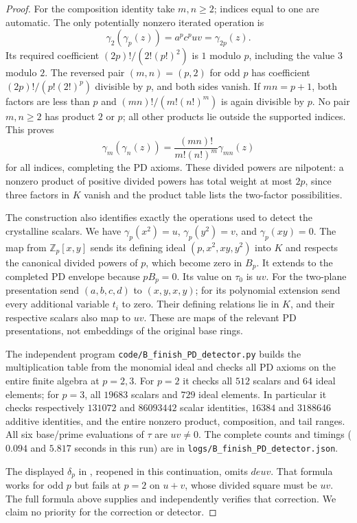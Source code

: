 \begin{proof}
For the composition identity take $m,n\geq2$; indices equal to one
are automatic. The only potentially nonzero iterated operation is
\[
 \gamma_2(\gamma_p(z))=a^pc^puv=\gamma_{2p}(z).
\]
Its required coefficient $(2p)!/(2!(p!)^2)$ is $1$ modulo $p$,
including the value $3$ modulo $2$. The reversed pair $(m,n)=(p,2)$
for odd $p$ has coefficient $(2p)!/(p!(2!)^p)$ divisible by $p$,
and both sides vanish. If $mn=p+1$, both factors are less than $p$
and $(mn)!/(m!(n!)^m)$ is again divisible by $p$. No pair $m,n\geq2$
has product $2$ or $p$; all other products lie outside the supported
indices. This proves
\[
 \gamma_m(\gamma_n(z))=
 \frac{(mn)!}{m!(n!)^m}\gamma_{mn}(z)
\]
for all indices, completing the PD axioms. These divided powers are
nilpotent: a nonzero product of positive divided powers has total
weight at most $2p$, since three factors in $K$ vanish and the
product table lists the two-factor possibilities.

The construction also identifies exactly the operations used to
detect the crystalline scalars. We have
$\gamma_p(x^2)=u$, $\gamma_p(y^2)=v$, and $\gamma_p(xy)=0$.
The map from $\mathbb Z_p[x,y]$ sends its defining ideal
$(p,x^2,xy,y^2)$ into $K$ and respects the canonical divided powers
of $p$, which become zero in $B_p$. It extends to the completed PD
envelope because $pB_p=0$. Its value on $\tau_0$ is $uv$.
For the two-plane presentation send $(a,b,c,d)$ to $(x,y,x,y)$;
for its polynomial extension send every additional variable $t_i$
to zero. Their defining relations lie in $K$, and their respective
scalars also map to $uv$. These are maps of the relevant PD
presentations, not embeddings of the original base rings.

The independent program \texttt{code/B\_finish\_PD\_detector.py}
builds the multiplication table from the monomial ideal and checks
all PD axioms on the entire finite algebra at $p=2,3$.
For $p=2$ it checks all $512$ scalars and $64$ ideal elements;
for $p=3$, all $19683$ scalars and $729$ ideal elements. In particular
it checks respectively $131072$ and $86093442$ scalar identities,
$16384$ and $3188646$ additive identities, and the entire nonzero
product, composition, and tail ranges. All six base/prime evaluations
of $\tau$ are $uv\ne0$. The complete counts and timings
($0.094$ and $5.817$ seconds in this run) are in
\texttt{logs/B\_finish\_PD\_detector.json}.

The displayed $\delta_p$ in
\cite[Example 60.22.1]{B:StacksCounterexamples}, reopened in this
continuation, omits $deuv$. That formula works for odd $p$ but fails
at $p=2$ on $u+v$, whose divided square must be $uv$.
The full formula above supplies and independently verifies that
correction. We claim no priority for the correction or detector.
\end{proof}

